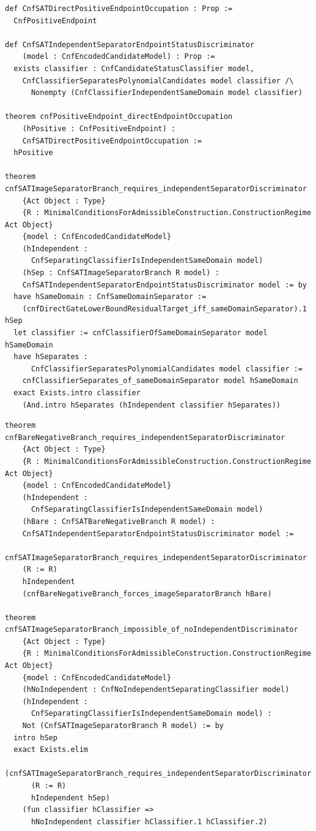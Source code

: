 \documentclass[11pt]{article}
\theoremstyle{definition}
\theoremstyle{remark}
\begin{document}
\begin{lstlisting}[basicstyle=\ttfamily\scriptsize]
def CnfSATDirectPositiveEndpointOccupation : Prop :=
  CnfPositiveEndpoint

def CnfSATIndependentSeparatorEndpointStatusDiscriminator
    (model : CnfEncodedCandidateModel) : Prop :=
  exists classifier : CnfCandidateStatusClassifier model,
    CnfClassifierSeparatesPolynomialCandidates model classifier /\
      Nonempty (CnfClassifierIndependentSameDomain model classifier)

theorem cnfPositiveEndpoint_directEndpointOccupation
    (hPositive : CnfPositiveEndpoint) :
    CnfSATDirectPositiveEndpointOccupation :=
  hPositive

theorem cnfSATImageSeparatorBranch_requires_independentSeparatorDiscriminator
    {Act Object : Type}
    {R : MinimalConditionsForAdmissibleConstruction.ConstructionRegime Act Object}
    {model : CnfEncodedCandidateModel}
    (hIndependent :
      CnfSeparatingClassifierIsIndependentSameDomain model)
    (hSep : CnfSATImageSeparatorBranch R model) :
    CnfSATIndependentSeparatorEndpointStatusDiscriminator model := by
  have hSameDomain : CnfSameDomainSeparator :=
    (cnfDirectGateLowerBoundResidualTarget_iff_sameDomainSeparator).1 hSep
  let classifier := cnfClassifierOfSameDomainSeparator model hSameDomain
  have hSeparates :
      CnfClassifierSeparatesPolynomialCandidates model classifier :=
    cnfClassifierSeparates_of_sameDomainSeparator model hSameDomain
  exact Exists.intro classifier
    (And.intro hSeparates (hIndependent classifier hSeparates))
\end{lstlisting}

\begin{lstlisting}[basicstyle=\ttfamily\scriptsize]
theorem cnfBareNegativeBranch_requires_independentSeparatorDiscriminator
    {Act Object : Type}
    {R : MinimalConditionsForAdmissibleConstruction.ConstructionRegime Act Object}
    {model : CnfEncodedCandidateModel}
    (hIndependent :
      CnfSeparatingClassifierIsIndependentSameDomain model)
    (hBare : CnfSATBareNegativeBranch R model) :
    CnfSATIndependentSeparatorEndpointStatusDiscriminator model :=
  cnfSATImageSeparatorBranch_requires_independentSeparatorDiscriminator
    (R := R)
    hIndependent
    (cnfBareNegativeBranch_forces_imageSeparatorBranch hBare)

theorem cnfSATImageSeparatorBranch_impossible_of_noIndependentDiscriminator
    {Act Object : Type}
    {R : MinimalConditionsForAdmissibleConstruction.ConstructionRegime Act Object}
    {model : CnfEncodedCandidateModel}
    (hNoIndependent : CnfNoIndependentSeparatingClassifier model)
    (hIndependent :
      CnfSeparatingClassifierIsIndependentSameDomain model) :
    Not (CnfSATImageSeparatorBranch R model) := by
  intro hSep
  exact Exists.elim
    (cnfSATImageSeparatorBranch_requires_independentSeparatorDiscriminator
      (R := R)
      hIndependent hSep)
    (fun classifier hClassifier =>
      hNoIndependent classifier hClassifier.1 hClassifier.2)
\end{lstlisting}
\end{document}
